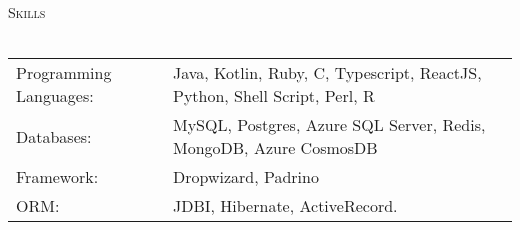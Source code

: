 \documentclass[a4paper]{article}
\newcommand{\lineunder} {
    \vspace*{-8pt} \\
    \hspace*{-18pt} \hrulefill \\
}
\newcommand{\header} [1] {
    {\hspace*{-18pt}\vspace*{6pt} \textsc{#1}}
    \vspace*{-6pt} \lineunder
}
\begin{document}
\header{Skills}
\begin{tabular}{ l l }
	Programming Languages: & Java, Kotlin, Ruby, C, Typescript, ReactJS, Python, Shell Script, Perl, R \\
	Databases:             & MySQL, Postgres, Azure SQL Server, Redis, MongoDB, Azure CosmosDB         \\
	Framework:             & Dropwizard, Padrino                                                       \\
	ORM:                   & JDBI, Hibernate, ActiveRecord.                                            \\
\end{tabular}
\vspace{2mm}





\ 
\end{document}
